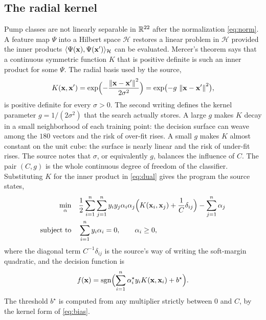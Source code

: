 \subsection{The radial kernel}

Pump classes are not linearly separable in \(\mathbb{R}^{22}\) after the normalization \eqref{eq:norm}.
A feature map \(\Psi\) into a Hilbert space \(\mathcal{H}\) restores a linear problem in \(\mathcal{H}\) provided the inner products \(\langle\Psi(\mathbf{x}),\Psi(\mathbf{x}')\rangle_{\mathcal{H}}\) can be evaluated.
Mercer's theorem says that a continuous symmetric function \(K\) that is positive definite is such an inner product for some \(\Psi\).
The radial basis used by the source,
\begin{equation}
K(\mathbf{x}, \mathbf{x}')
=\exp\Bigl(-\frac{\left\lVert \mathbf{x}-\mathbf{x}' \right\rVert^{2}}{2\sigma^{2}}\Bigr)
=\exp\bigl(-g\,\left\lVert \mathbf{x}-\mathbf{x}' \right\rVert^{2}\bigr),
\label{eq:rbf}
\end{equation}
is positive definite for every \(\sigma>0\).
The second writing defines the kernel parameter \(g=1/(2\sigma^{2})\) that the search actually stores.
A large \(g\) makes \(K\) decay in a small neighborhood of each training point: the decision surface can weave among the \(180\) vectors and the risk of over-fit rises.
A small \(g\) makes \(K\) almost constant on the unit cube: the surface is nearly linear and the risk of under-fit rises.
The source notes that \(\sigma\), or equivalently \(g\), balances the influence of \(C\).
The pair \((C, g)\) is the whole continuous degree of freedom of the classifier.
Substituting \(K\) for the inner product in \eqref{eq:dual} gives the program the source states,
\begin{equation}
\begin{aligned}
\min_{\alpha}\quad
&\frac{1}{2}\sum_{i=1}^{n}\sum_{j=1}^{n}
y_{i} y_{j}\alpha_{i}\alpha_{j}
\Bigl(K(\mathbf{x}_{i}, \mathbf{x}_{j})+\frac{1}{C}\delta_{ij}\Bigr)
-\sum_{j=1}^{n}\alpha_{j}\\
\text{subject to}\quad
&\sum_{i=1}^{n} y_{i}\alpha_{i}=0,\qquad \alpha_{i}\ge 0,
\end{aligned}
\label{eq:dualk}
\end{equation}
where the diagonal term \(C^{-1}\delta_{ij}\) is the source's way of writing the soft-margin quadratic, and the decision function is
\begin{equation}
f(\mathbf{x})=\operatorname{sgn}\Bigl(\sum_{i=1}^{n}\alpha_{i}^{\star} y_{i} K(\mathbf{x}, \mathbf{x}_{i})+b^{\star}\Bigr).
\label{eq:decf}
\end{equation}
The threshold \(b^{\star}\) is computed from any multiplier strictly between \(0\) and \(C\), by the kernel form of \eqref{eq:bias}.

